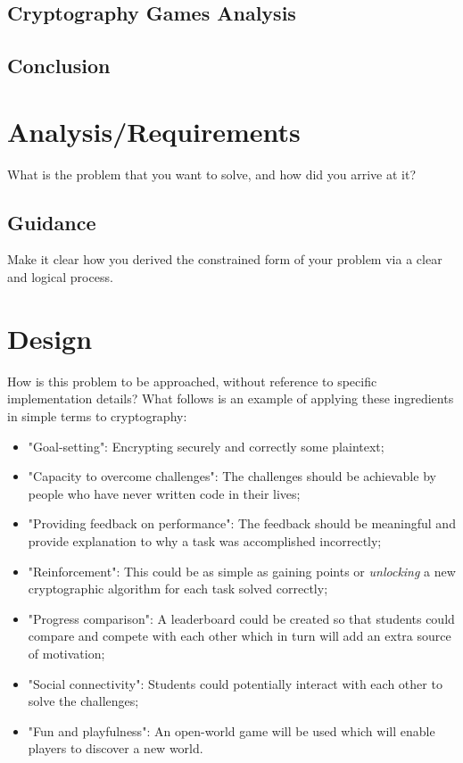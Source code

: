 \documentclass{l4proj}
\begin{document}
\section{Cryptography Games Analysis}

\section{Conclusion}

\chapter{Analysis/Requirements}
What is the problem that you want to solve, and how did you arrive at it?
\section{Guidance}
Make it clear how you derived the constrained form of your problem via a clear and logical process. 

\chapter{Design}
How is this problem to be approached, without reference to specific implementation details? 
What follows is an example of applying these ingredients in simple terms to cryptography:
\begin{itemize}
    \item "Goal-setting": Encrypting securely and correctly some plaintext;
    \item "Capacity to overcome challenges": The challenges should be achievable by people who have never written code in their lives;
    \item "Providing feedback on performance": The feedback should be meaningful and provide explanation to why a task was accomplished incorrectly;
    \item "Reinforcement": This could be as simple as gaining points or \textit{unlocking} a new cryptographic algorithm for each task solved correctly;
    \item "Progress comparison": A leaderboard could be created so that students could compare and compete with each other which in turn will add an extra source of motivation;
    \item "Social connectivity": Students could potentially interact with each other to solve the challenges;
    \item "Fun and playfulness": An open-world game will be used which will enable players to discover a new world.
\end{itemize}
\end{document}
